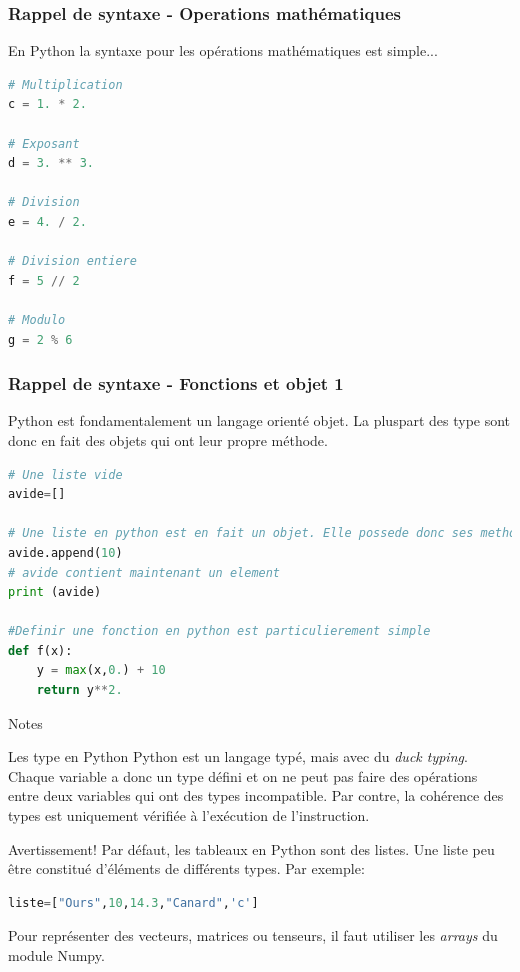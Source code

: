 \documentclass[]{beamer}
\begin{document}
\begin{frame}[fragile]
\frametitle{Rappel de syntaxe - Operations mathématiques}

En Python la syntaxe pour les opérations mathématiques est simple...

\begin{lstlisting}[language=Python]
# Multiplication
c = 1. * 2.

# Exposant
d = 3. ** 3.

# Division
e = 4. / 2.

# Division entiere
f = 5 // 2

# Modulo
g = 2 % 6
\end{lstlisting}
\end{frame}

\begin{frame}[fragile]
\frametitle{Rappel de syntaxe - Fonctions et objet 1 }


Python est fondamentalement un langage orienté objet. La pluspart des type sont donc en fait des objets qui ont leur propre méthode.
\begin{lstlisting}[language=Python]
# Une liste vide
avide=[]

# Une liste en python est en fait un objet. Elle possede donc ses methodes
avide.append(10)
# avide contient maintenant un element
print (avide)

#Definir une fonction en python est particulierement simple
def f(x):
    y = max(x,0.) + 10
    return y**2.
\end{lstlisting}
\end{frame}

\begin{frame}[fragile]{Notes}
\begin{block}{Les type en Python}
Python est un langage typé, mais avec du \textit{duck typing}. Chaque variable a donc un type défini et on ne peut pas faire des opérations entre deux variables qui ont des types incompatible. Par contre, la cohérence des types est uniquement vérifiée à l'exécution de l'instruction.
\end{block}
\begin{block}{Avertissement!}
Par défaut, les tableaux en Python sont des listes. Une liste peu être constitué d'éléments de différents types. Par exemple:
\begin{lstlisting}[language=Python]
liste=["Ours",10,14.3,"Canard",'c']
\end{lstlisting}
Pour représenter des vecteurs, matrices ou tenseurs, il faut utiliser les \textit{arrays} du module Numpy.
\end{block}

\end{frame}
\end{document}
